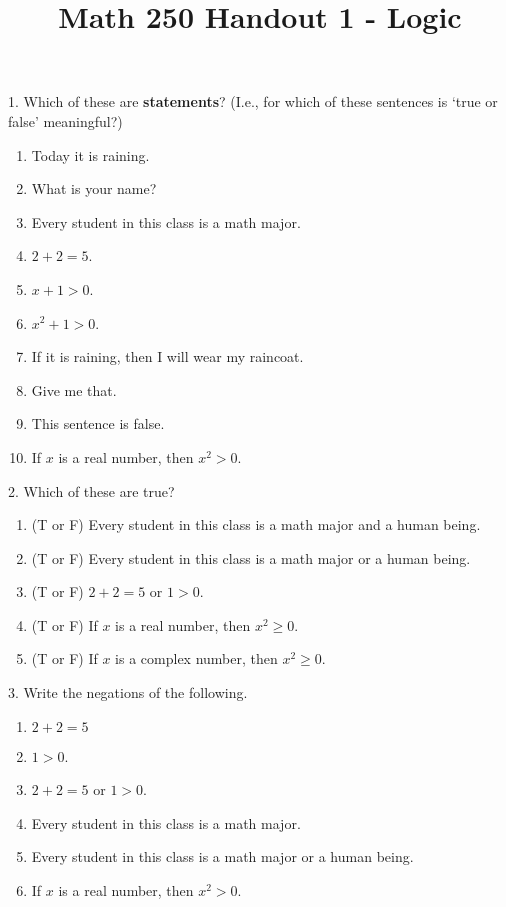 \documentclass[12pt, reqno]{amsart}
\begin{document}
\title[Math 250 Handout 1 - Logic]{Math 250 Handout 1 - Logic}\maketitle

1. Which of these are \textbf{statements}? (I.e., for which of these sentences is `true or false' meaningful?)
\vspace{10pt}
\begin{enumerate}
\item Today it is raining.
\item What is your name?
\item Every student in this class is a math major.
\item $2 + 2 = 5$.
\item $x + 1  > 0$.
\item $x^2 + 1  > 0$.
\item If it is raining, then I will wear my raincoat.
\item Give me that.
\item This sentence is false.
\item If $x$ is a real number, then $x^2 > 0$.
\end{enumerate}
\vspace{20pt}

2. Which of these are true? 
\vspace{10pt}
\begin{enumerate}
\item (T or F) Every student in this class is a math major and a human being.
\item (T or F) Every student in this class is a math major or a human being.
\item (T or F) $2 + 2 = 5$ or  $1  > 0$.
\item (T or F) If $x$ is a real number, then $x^2 \geq 0$.
\item (T or F) If $x$ is a complex number, then $x^2 \geq 0$.
\end{enumerate}
\vspace{20pt}

3. Write the negations of the following.
\vspace{10pt}
\begin{enumerate}
\item $2 + 2 = 5$
\item $1  > 0$.
\item $2 + 2 = 5$ or  $1  > 0$.
\item Every student in this class is a math major.
\item Every student in this class is a math major or a human being.
\item If $x$ is a real number, then $x^2 > 0$.
\end{enumerate}
\vspace{20pt}
\end{document}
